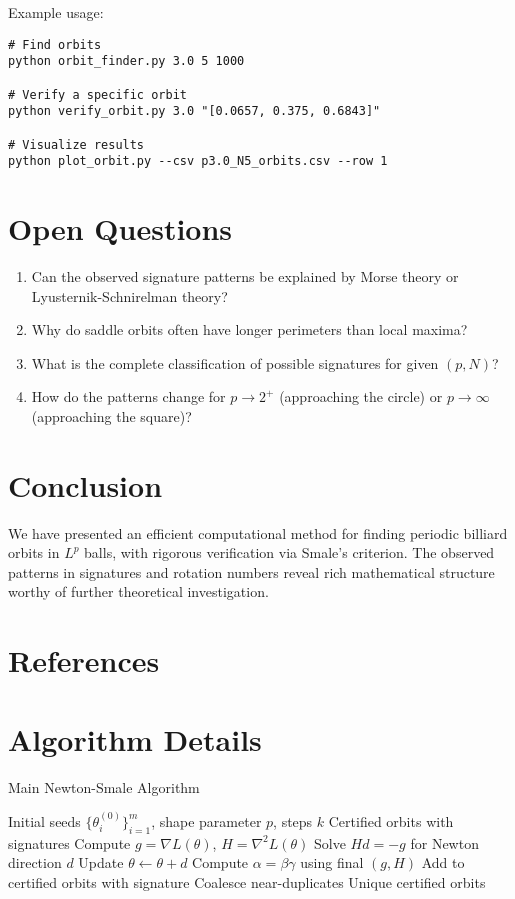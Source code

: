 \documentclass[11pt]{article}
\theoremstyle{plain}
\theoremstyle{definition}
\theoremstyle{remark}
\begin{document}
Example usage:
\begin{verbatim}
# Find orbits
python orbit_finder.py 3.0 5 1000

# Verify a specific orbit
python verify_orbit.py 3.0 "[0.0657, 0.375, 0.6843]"

# Visualize results
python plot_orbit.py --csv p3.0_N5_orbits.csv --row 1
\end{verbatim}

\section{Open Questions}

\begin{enumerate}
\item Can the observed signature patterns be explained by Morse theory or Lyusternik-Schnirelman theory?
\item Why do saddle orbits often have longer perimeters than local maxima?
\item What is the complete classification of possible signatures for given $(p, N)$?
\item How do the patterns change for $p \to 2^+$ (approaching the circle) or $p \to \infty$ (approaching the square)?
\end{enumerate}

\section{Conclusion}

We have presented an efficient computational method for finding periodic billiard orbits in $L^p$ balls, with rigorous verification via Smale's criterion. The observed patterns in signatures and rotation numbers reveal rich mathematical structure worthy of further theoretical investigation.

\section*{References}



\appendix

\section{Algorithm Details}

\begin{algorithm}
\caption{Main Newton-Smale Algorithm}
\begin{algorithmic}
\REQUIRE Initial seeds $\{\theta^{(0)}_i\}_{i=1}^m$, shape parameter $p$, steps $k$
\ENSURE Certified orbits with signatures
        \STATE Compute $g = \nabla L(\theta)$, $H = \nabla^2 L(\theta)$
        \STATE Solve $Hd = -g$ for Newton direction $d$
        \STATE Update $\theta \leftarrow \theta + d$
    \ENDFOR
    \STATE Compute $\alpha = \beta \gamma$ using final $(g, H)$
        \STATE Add to certified orbits with signature
    \ENDIF
\ENDFOR
\STATE Coalesce near-duplicates
\RETURN Unique certified orbits
\end{algorithmic}
\end{algorithm}
\end{document}
